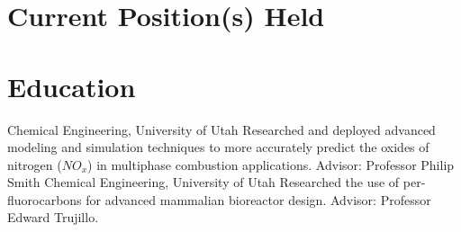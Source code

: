 \documentclass[letterpaper]{twentysecondcv_spd} %
\begin{document}

\section{Current Position(s) Held}

\begin{twentyshort} %
  \end{twentyshort}
  

\section{Education}

\begin{twenty} %
	 {\normalfont Chemical Engineering, University of Utah} {Researched and deployed advanced
modeling and simulation techniques to more accurately predict the oxides of nitrogen ($NO_x$) in multiphase combustion applications. Advisor: Professor Philip Smith}
	 {\normalfont Chemical Engineering, University of Utah} {Researched the use of per-fluorocarbons for advanced mammalian bioreactor design. Advisor: Professor Edward Trujillo.}
\end{twenty}

\end{document}
